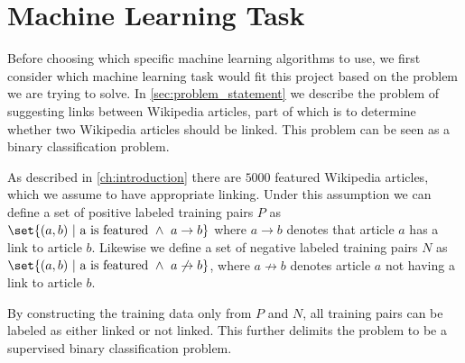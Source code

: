 

\section{Machine Learning Task}\label{sec:machine_learning_task}
Before choosing which specific machine learning algorithms to use, we first consider which machine learning task would fit this project based on the problem we are trying to solve. In \cref{sec:problem_statement} we describe the problem of suggesting links between Wikipedia articles, part of which is to determine whether two Wikipedia articles should be linked. This problem can be seen as a binary classification problem.

As described in \cref{ch:introduction} there are $5000$ featured Wikipedia articles, which we assume to have appropriate linking. Under this assumption we can define a set of positive labeled training pairs $P$ as $\set{(a,b)\ |\ \text{a is featured}\ \wedge\ a \to b}$ where $a \to b$ denotes that article $a$ has a link to article $b$. Likewise we define a set of negative labeled training pairs $N$ as  $\set{(a,b)\ |\ \text{a is featured}\ \wedge\ a \not\to b}$, where $a \not\to b$ denotes article $a$ not having a link to article $b$.

By constructing the training data only from $P$ and $N$, all training pairs can be labeled as either linked or not linked. This further delimits the problem to be a supervised binary classification problem.
